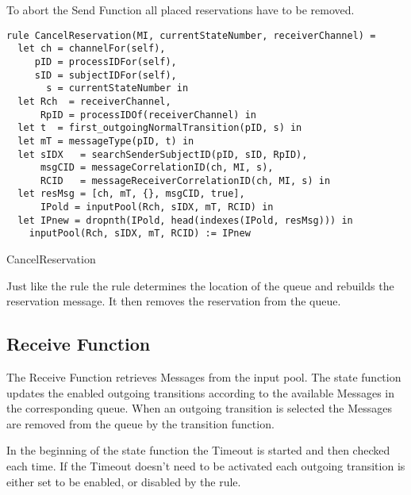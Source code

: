 To abort the Send Function all placed reservations have to be removed.


\begin{listing}[htbp]
\begin{verbatim}
rule CancelReservation(MI, currentStateNumber, receiverChannel) =
  let ch = channelFor(self),
     pID = processIDFor(self),
     sID = subjectIDFor(self),
       s = currentStateNumber in
  let Rch  = receiverChannel,
      RpID = processIDOf(receiverChannel) in
  let t  = first_outgoingNormalTransition(pID, s) in
  let mT = messageType(pID, t) in
  let sIDX   = searchSenderSubjectID(pID, sID, RpID),
      msgCID = messageCorrelationID(ch, MI, s),
      RCID   = messageReceiverCorrelationID(ch, MI, s) in
  let resMsg = [ch, mT, {}, msgCID, true],
      IPold = inputPool(Rch, sIDX, mT, RCID) in
  let IPnew = dropnth(IPold, head(indexes(IPold, resMsg))) in
    inputPool(Rch, sIDX, mT, RCID) := IPnew
\end{verbatim}
\caption{CancelReservation}
\label{lst:shortasm:CancelReservation}
\end{listing}


Just like the  rule the
 rule determines the location of the queue and
rebuilds the reservation message. It then removes the reservation from the
queue.


\subsection{Receive Function}


The Receive Function retrieves Messages from the input pool. The state function
updates the enabled outgoing transitions according to the available Messages in
the corresponding queue. When an outgoing transition is selected the Messages
are removed from the queue by the transition function.


In the beginning of the state function the Timeout is started and then checked
each time.
If the Timeout doesn't need to be activated each outgoing transition is either set to
be enabled, or disabled by the  rule.


